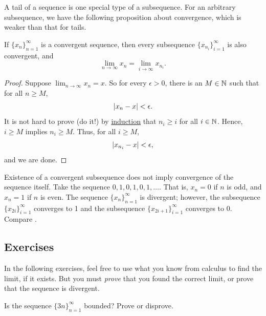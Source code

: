 A tail of a sequence is one special type of a subsequence.  For an arbitrary
subsequence, we have the following proposition about convergence,
which is weaker than that for tails.

\begin{prop} \label{prop:seqtosubseq}
If $\{ x_n \}_{n=1}^\infty$ is a convergent sequence,
then every subsequence $\{ x_{n_i} \}_{i=1}^\infty$ is also convergent, and
\begin{equation*}
\lim_{n\to \infty} x_n = 
\lim_{i\to \infty} x_{n_i} .
\end{equation*}
\end{prop}

\begin{proof}
Suppose $\lim_{n\to \infty} x_n = x$.  So for every
$\epsilon > 0$, there is an $M \in {\mathbb{N}}$ such that for all $n \geq M$,
\begin{equation*}
\lvert {x_n - x} \rvert < \epsilon .
\end{equation*}
It is not hard to prove (do it!) by \hyperref[induction:thm]{induction} that
$n_i \geq i$ for all $i \in {\mathbb{N}}$.  Hence, $i \geq M$ implies $n_i \geq M$.  Thus,
for all $i \geq M$,
\begin{equation*}
\lvert {x_{n_i} - x} \rvert < \epsilon ,
\end{equation*}
and we are done.
\end{proof}

\begin{example}
Existence of a convergent subsequence does not imply
convergence of the sequence itself.
Take the sequence $0,1,0,1,0,1,\ldots$.  That is,
$x_n = 0$ if $n$ is odd, and $x_n = 1$ if $n$ is even.  The sequence
$\{ x_n \}_{n=1}^\infty$ is divergent; however, the subsequence
$\{ x_{2i} \}_{i=1}^\infty$ converges to 1 and the subsequence
$\{ x_{2i+1} \}_{i=1}^\infty$ converges to 0.  Compare .
\end{example}

\subsection{Exercises}

\begin{exnote}
In the following exercises, feel free to use what you know from calculus to
find the limit, if it exists.  But you must \emph{prove}
that you
found the correct limit, or prove that the sequence is divergent.
\end{exnote}

\begin{exercise}
Is the sequence
$\{ 3n \}_{n=1}^\infty$
bounded?  Prove or disprove.
\end{exercise}

